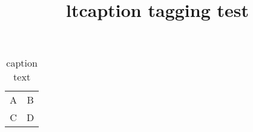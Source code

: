 \documentclass{article}
\title{ltcaption tagging test}
\begin{document}
\begin{longtable}[l]{cc}
\caption{caption text} \\
A & B \\
C & D
\end{longtable}
\end{document}
